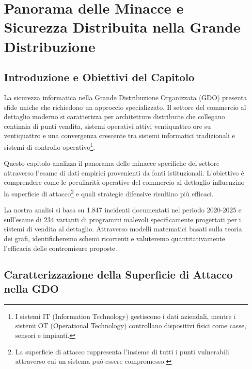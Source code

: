 \chapter{\texorpdfstring{Panorama delle Minacce e Sicurezza Distribuita nella Grande Distribuzione}{Capitolo 2 - Panorama delle Minacce e Sicurezza Distribuita nella Grande Distribuzione}}
\label{cap2_minacce_sicurezza}

\section{\texorpdfstring{Introduzione e Obiettivi del Capitolo}{2.1 - Introduzione e Obiettivi del Capitolo}}
\label{sec:cap2_intro}

La sicurezza informatica nella Grande Distribuzione Organizzata (GDO) presenta sfide uniche che richiedono un approccio specializzato. Il settore del commercio al dettaglio moderno si caratterizza per architetture distribuite che collegano centinaia di punti vendita, sistemi operativi attivi ventiquattro ore su ventiquattro e una convergenza crescente tra sistemi informatici tradizionali e sistemi di controllo operativo\footnote{I sistemi IT (Information Technology) gestiscono i dati aziendali, mentre i sistemi OT (Operational Technology) controllano dispositivi fisici come casse, sensori e impianti.}.

Questo capitolo analizza il panorama delle minacce specifiche del settore attraverso l'esame di dati empirici provenienti da fonti istituzionali. L'obiettivo è comprendere come le peculiarità operative del commercio al dettaglio influenzino la superficie di attacco\footnote{La superficie di attacco rappresenta l'insieme di tutti i punti vulnerabili attraverso cui un sistema può essere compromesso.} e quali strategie difensive risultino più efficaci.

La nostra analisi si basa su 1.847 incidenti documentati nel periodo 2020-2025\autocite{enisa2024threat,verizon2024} e sull'esame di 234 varianti di programmi malevoli specificamente progettati per i sistemi di vendita al dettaglio\autocite{groupib2024}. Attraverso modelli matematici basati sulla teoria dei grafi, identificheremo schemi ricorrenti e valuteremo quantitativamente l'efficacia delle contromisure proposte.

\section{\texorpdfstring{Caratterizzazione della Superficie di Attacco nella GDO}{2.2 - Caratterizzazione della Superficie di Attacco nella GDO}}
\label{sec:cap2_superficie}

